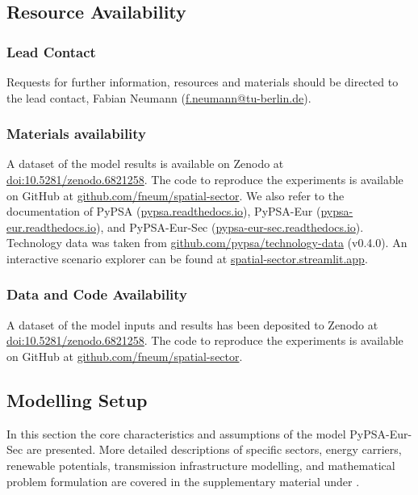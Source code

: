 \subsection*{Resource Availability}

\subsubsection*{Lead Contact}

Requests for further information, resources and materials should be directed to
the lead contact, Fabian Neumann
(\href{mailto:f.neumann@tu-berlin.de}{f.neumann@tu-berlin.de}).

\subsubsection*{Materials availability}

A dataset of the model results is available on Zenodo at \href{https://doi.org/10.5281/zenodo.6821258}{doi:10.5281/zenodo.6821258}.
The code to reproduce the experiments is available on GitHub at \href{https://github.com/fneum/spatial-sector}{github.com/fneum/spatial-sector}.
We also refer to the documentation of PyPSA (\href{https://pypsa.readthedocs.io}{pypsa.readthedocs.io}),
PyPSA-Eur (\href{https://pypsa-eur.readthedocs.io}{pypsa-eur.readthedocs.io}), and
PyPSA-Eur-Sec (\href{https://pypsa-eur-sec.readthedocs.io}{pypsa-eur-sec.readthedocs.io}).
Technology data was taken from \href{https://github.com/pypsa/technology-data}{github.com/pypsa/technology-data} (v0.4.0).
An interactive scenario explorer can be found at \href{https://spatial-sector.streamlit.app}{spatial-sector.streamlit.app}.

\subsubsection*{Data and Code Availability}

A dataset of the model inputs and results has been deposited to Zenodo at
\href{https://doi.org/10.5281/zenodo.6821258}{doi:10.5281/zenodo.6821258}. The
code to reproduce the experiments is available on GitHub at
\href{https://github.com/fneum/spatial-sector}{github.com/fneum/spatial-sector}.

\subsection*{Modelling Setup}

In this section the core characteristics and assumptions of the model
PyPSA-Eur-Sec are presented. More detailed descriptions of specific sectors,
energy carriers, renewable potentials, transmission infrastructure modelling,
and mathematical problem formulation are covered in the supplementary material
under .

